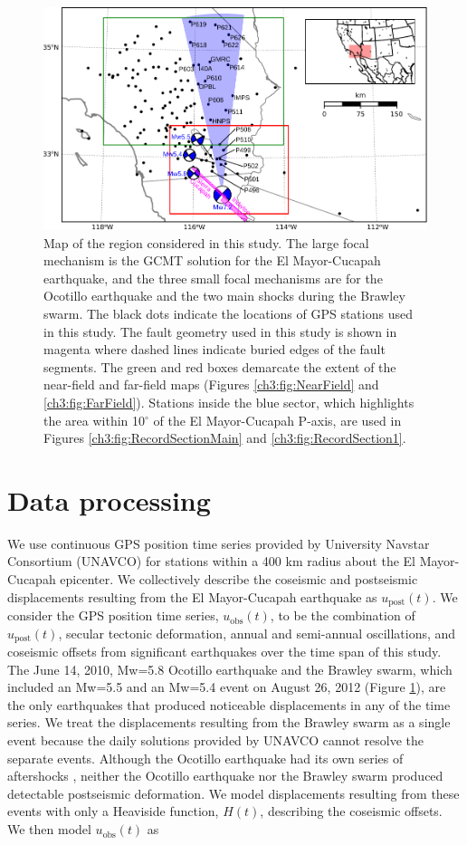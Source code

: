 \begin{figure}
\includegraphics[scale=1.0]{ch3/figures/2016jb013114-p01} 
\caption{Map of the region considered in this study.  The large focal mechanism is the GCMT solution for the El Mayor-Cucapah earthquake, and the three small focal mechanisms are for the Ocotillo earthquake and the two main shocks during the Brawley swarm.  The black dots indicate the locations of GPS stations used in this study.  The fault geometry used in this study is shown in magenta where dashed lines indicate buried edges of the fault segments.  The green and red boxes demarcate the extent of the near-field and far-field maps (Figures \ref{ch3:fig:NearField} and \ref{ch3:fig:FarField}).  Stations inside the blue sector, which highlights the area within 10$^\circ$ of the El Mayor-Cucapah P-axis, are used in Figures \ref{ch3:fig:RecordSectionMain} and \ref{ch3:fig:RecordSection1}.}       
\label{ch3:fig:ContextMap}
\end{figure}

\section{Data processing}\label{ch3:sec:Data}
We use continuous GPS position time series provided by University Navstar Consortium (UNAVCO) for stations within a 400 km radius about the El Mayor-Cucapah epicenter. We collectively describe the coseismic and postseismic displacements resulting from the El Mayor-Cucapah earthquake as $u_\mathrm{post}(t)$.  We consider the GPS position time series, $u_\mathrm{obs}(t)$, to be the combination of $u_\mathrm{post}(t)$, secular tectonic deformation, annual and semi-annual oscillations, and coseismic offsets from significant earthquakes over the time span of this study.  The June 14, 2010, Mw=5.8 Ocotillo earthquake and the Brawley swarm, which included an Mw=5.5 and an Mw=5.4 event on August 26, 2012 (Figure \ref{ch3:fig:ContextMap}), are the only earthquakes that produced noticeable displacements in any of the time series.  We treat the displacements resulting from the Brawley swarm as a single event because the daily solutions provided by UNAVCO cannot resolve the separate events.  Although the Ocotillo earthquake had its own series of aftershocks \citep{Hauksson2011}, neither the Ocotillo earthquake nor the Brawley swarm produced detectable postseismic deformation.  We model displacements resulting from these events with only a Heaviside function, $H(t)$, describing the coseismic offsets.  We then model $u_\mathrm{obs}(t)$ as 

